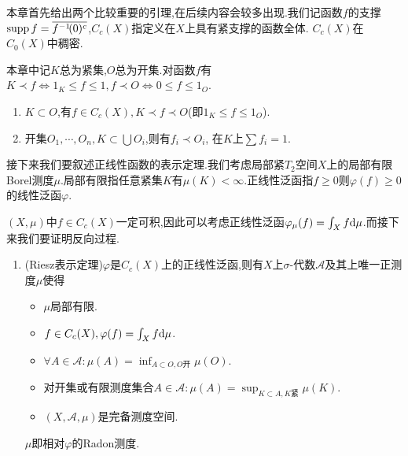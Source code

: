 \documentclass{article}
\begin{document}
本章首先给出两个比较重要的引理,在后续内容会较多出现.我们记函数$f$的支撑$\operatorname{supp} f=\overline{f^{-1}\!(0)^c}$,$C_c(X)$指定义在$X$上具有紧支撑的函数全体.
$C_c(X)$在$C_0(X)$中稠密.\why

本章中记$K$总为紧集,$O$总为开集.对函数$f$有$K\prec f\iff 1_K\leq f\leq 1, f\prec O\iff 0\leq f\leq 1_O$.

\begin{enumerate}
    \item $K\subset O$,有$f\in C_c(X), K\prec f\prec O$(即$1_K\leq f\leq 1_O$).
    \item 开集$O_1,\cdots,O_n, K\subset \bigcup O_i$,则有$f_i\prec O_i$, 在$K$上$\sum f_i=1$.
\end{enumerate}

接下来我们要叙述正线性函数的表示定理.我们考虑局部紧$T_2$空间$X$上的局部有限Borel测度$\mu$.局部有限指任意紧集$K$有$\mu(K)<\infty$.正线性泛函指$f\geq 0$则$\varphi(f)\geq 0$的线性泛函$\varphi$.

$(X,\mu)$中$f\in C_c(X)$一定可积,因此可以考虑正线性泛函$\varphi_\mu(f)=\int_Xf\mathrm{d} \mu$.而接下来我们要证明反向过程.

\begin{enumerate}[resume]
    \item (Riesz表示定理\footnotemark)$\varphi$是$C_c(X)$上的正线性泛函,则有$X$上$\sigma$-代数$\mathcal{A}$及其上唯一正测度$\mu$使得\begin{itemize}
        \item $\mu$局部有限.
        \item $f\in C_c(X), \varphi(f)=\int_Xf\mathrm{d} \mu$.
        \item $\forall A\in \mathcal{A}:\mu(A)=\inf_{A\subset O, O\text{开}}\mu(O)$.
        \item 对开集或有限测度集合$A\in \mathcal{A}:\mu(A)=\sup_{K\subset A, K\text{紧}}\mu(K)$.
        \item $(X,\mathcal{A},\mu)$是完备测度空间.
    \end{itemize}
    $\mu$即相对$\varphi$的Radon测度.
\end{enumerate}
\end{document}
